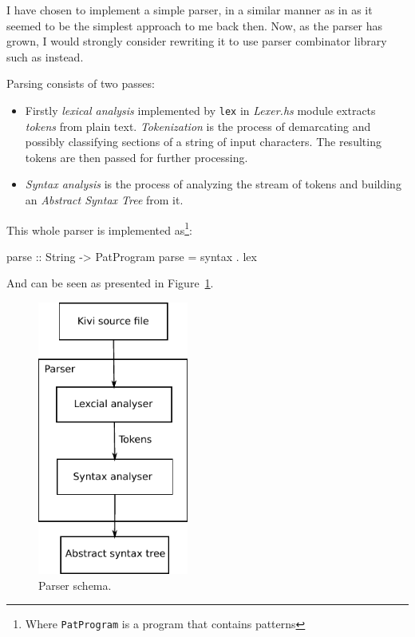 \documentclass[12pt,a4paper]{report}
\begin{document}
I have chosen to implement a simple parser, in a similar manner as in
\cite{JonLes00} as it seemed to be the simplest approach to me back then. Now, as
the parser has grown, I would strongly consider rewriting it to use parser
combinator library such as \cite{website:parsec} instead.

Parsing consists of two passes:

\begin{itemize}
  \item Firstly \textit{lexical analysis} implemented by \texttt{lex} in
    \textit{Lexer.hs} module extracts \textit{tokens} from plain text.
    \textit{Tokenization} is the process of demarcating and possibly
    classifying sections of a string of input characters. The resulting tokens
    are then passed for further processing.
  \item \textit{Syntax analysis} is the process of analyzing the stream of
    tokens and building an \textit{Abstract Syntax Tree} from it.
\end{itemize}

This whole parser is implemented as\footnote{Where \texttt{PatProgram} is a
program that contains patterns}:

\vspace*{0.2in}
\begin{code}[style=haskell]
  parse :: String -> PatProgram
  parse = syntax . lex
\end{code}

And can be seen as presented in Figure~\ref{fig:parser}.

\vspace*{0.2in}
\begin{figure}[h!]
  \centering
  \includegraphics[height=9cm]{parser}
  \caption{Parser schema.}
  \label{fig:parser}
\end{figure}
\end{document}

